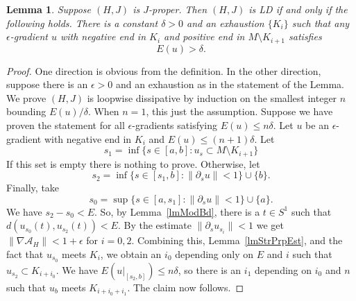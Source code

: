 \documentclass[11pt]{amsart}
\newtheorem{lm}[tm]{Lemma}
\theoremstyle{definition}
\theoremstyle{remark}
\begin{document}
\begin{lm}\label{lmLoopDisQuant}
Suppose $(H,J)$ is $J$-proper. Then $(H,J)$ is LD if and only if the following holds. There is a constant $\delta>0$ and an exhaustion $\{K_i\}$ such that any $\epsilon$-gradient $u$ with negative end in $K_i$ and positive end in $M\setminus K_{i+1}$ satisfies
\[
E(u)>\delta.
\]
\end{lm}
\begin{proof}
One direction is obvious from the definition. In the other direction, suppose there is an $\epsilon>0 $ and an exhaustion as in the statement of the Lemma. We prove $(H,J)$ is loopwise dissipative by induction on the smallest integer $n$ bounding $E(u)/\delta$. When $n=1$, this just the assumption. Suppose we have proven the statement for all $\epsilon$-gradients satisfying $E(u)\leq n\delta$. Let $u$ be an $\epsilon$-gradient with negative end in $K_i$ and $E(u)\leq (n+1)\delta$. Let
\[
s_1=\inf \{s\in[a,b]:u_s\subset M\setminus K_{i+1}\}
\]
If this set is empty there is nothing to prove. Otherwise, let
\[
s_2=\inf\{s\in[s_1,b]:\|\partial_su\|<1\}\cup\{b\}.
\]
Finally, take
\[
s_0=\sup\{s\in[a,s_1]:\|\partial_su\|<1\}\cup\{a\}.
\]
We have $s_2-s_0<E$. So, by Lemma~\ref{lmModBd}, there is a $t\in S^1$ such that $d(u_{s_0}(t),u_{s_2}(t))<E$. By the estimate $\|\partial_{s}u_{s_i}\|<1$  we get $\|\nabla\mathcal{A}_H\|<1+\epsilon$ for $i=0,2$. Combining this, Lemma~\ref{lmStrPrpEst}, and the fact that $u_{s_0}$ meets $K_i$, we obtain an $i_0$ depending only on $E$ and $i$ such that $u_{s_2}\subset K_{i+i_0}$. We have $E(u|_{[s_2,b]})\leq n\delta$, so there is an $i_1$ depending on $i_0$ and $n$ such that $u_b$ meets $K_{i+i_0+i_1}$. The claim now follows.
\end{proof}
\end{document}
